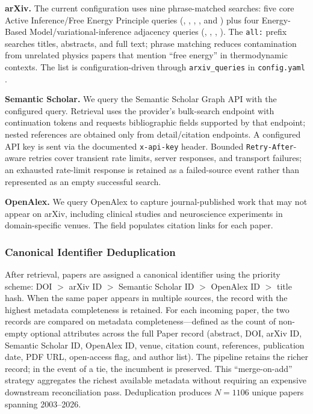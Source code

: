 \documentclass[
  english,
]{article}
\begin{document}
\textbf{arXiv.} The current configuration uses nine phrase-matched
searches: five core Active Inference/Free Energy Principle queries
(,
,
,
, and
) plus
four Energy-Based Model/variational-inference adjacency queries
(,
,
,
).
The \texttt{all:} prefix searches titles, abstracts, and full text;
phrase matching reduces contamination from unrelated physics papers that
mention ``free energy'' in thermodynamic contexts. The list is
configuration-driven through \texttt{arxiv\_queries} in
\texttt{config.yaml} \citep{lecun2006tutorial}.

\textbf{Semantic Scholar.} We query the Semantic Scholar Graph API
\citep{kinney2023semantic} with the configured query. Retrieval uses the
provider's bulk-search endpoint with continuation tokens and requests
bibliographic fields supported by that endpoint; nested references are
obtained only from detail/citation endpoints. A configured API key is
sent via the documented \texttt{x-api-key} header. Bounded
\texttt{Retry-After}-aware retries cover transient rate limits, server
responses, and transport failures; an exhausted rate-limit response is
retained as a failed-source event rather than represented as an empty
successful search.

\textbf{OpenAlex.} We query OpenAlex \citep{priem2022openalex} to
capture journal-published work that may not appear on arXiv, including
clinical studies and neuroscience experiments in domain-specific venues.
The  field populates citation links for each
paper.

\subsubsection{Canonical Identifier
Deduplication}\label{canonical-identifier-deduplication}

After retrieval, papers are assigned a canonical identifier using the
priority scheme: DOI \(>\) arXiv ID \(>\) Semantic Scholar ID \(>\)
OpenAlex ID \(>\) title hash. When the same paper appears in multiple
sources, the record with the highest metadata completeness is retained.
For each incoming paper, the two records are compared on metadata
completeness---defined as the count of non-empty optional attributes
across the full Paper record (abstract, DOI, arXiv ID, Semantic Scholar
ID, OpenAlex ID, venue, citation count, references, publication date,
PDF URL, open-access flag, and author list). The pipeline retains the
richer record; in the event of a tie, the incumbent is preserved. This
``merge-on-add'' strategy aggregates the richest available metadata
without requiring an expensive downstream reconciliation pass.
Deduplication produces \(N = 1106\) unique papers spanning 2003--2026.
\end{document}
